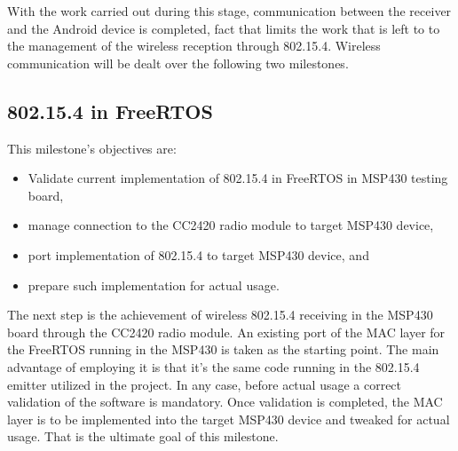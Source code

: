 		With the work carried out during this stage, communication between the receiver and the Android device is
		completed, fact that limits the work that is left to to the management of the wireless reception through
		802.15.4. Wireless communication will be dealt over the following two milestones. 

	\subsection{802.15.4 in FreeRTOS}
	\label{ssec:802.15.4.FreeRTOS}	
		This milestone's objectives are:
		\begin{itemize}
		\item Validate current implementation of 802.15.4 in FreeRTOS in MSP430 testing board,
		\item manage connection to the CC2420 radio module to target MSP430 device,
		\item port implementation of 802.15.4 to target MSP430 device, and
		\item prepare such implementation for actual usage.
		\end{itemize}

		The next step is the achievement of wireless 802.15.4 receiving in the MSP430 board through the CC2420 radio module. An existing port of the MAC layer  for the FreeRTOS running in the MSP430 is taken as the starting point. The main advantage of employing it is that it's the same code running in the 802.15.4 emitter utilized in the project. In any case, before actual usage a correct validation of the software is mandatory. Once validation is completed, the MAC layer is to be implemented into the target MSP430 device and tweaked for actual usage. That is the ultimate goal of this milestone.\\

